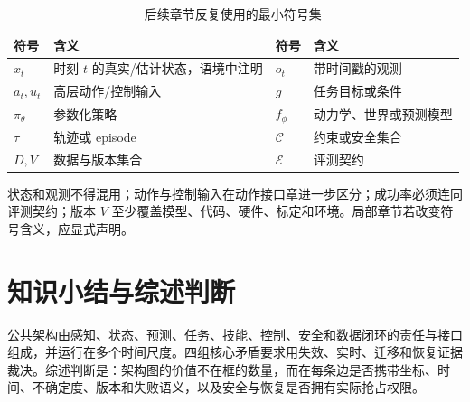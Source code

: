 \begin{table}[H]
\centering
\caption{后续章节反复使用的最小符号集}
\label{tab:common-symbols}
\begin{tabularx}{\textwidth}{p{}Yp{0.18\textwidth}Y}
\toprule
符号 & 含义 & 符号 & 含义 \\
\midrule
$x_t$ & 时刻 $t$ 的真实/估计状态，语境中注明 & $o_t$ & 带时间戳的观测 \\
$a_t,u_t$ & 高层动作/控制输入 & $g$ & 任务目标或条件 \\
$\pi_\theta$ & 参数化策略 & $f_\phi$ & 动力学、世界或预测模型 \\
$\tau$ & 轨迹或 episode & $\mathcal C$ & 约束或安全集合 \\
$D,V$ & 数据与版本集合 & $\mathcal E$ & 评测契约 \\
\bottomrule
\end{tabularx}
\end{table}

状态和观测不得混用；动作与控制输入在动作接口章进一步区分；成功率必须连同评测契约；版本 $V$ 至少覆盖模型、代码、硬件、标定和环境。局部章节若改变符号含义，应显式声明。

\section{知识小结与综述判断}

公共架构由感知、状态、预测、任务、技能、控制、安全和数据闭环的责任与接口组成，并运行在多个时间尺度。四组核心矛盾要求用失效、实时、迁移和恢复证据裁决。综述判断是：架构图的价值不在框的数量，而在每条边是否携带坐标、时间、不确定度、版本和失败语义，以及安全与恢复是否拥有实际抢占权限。
